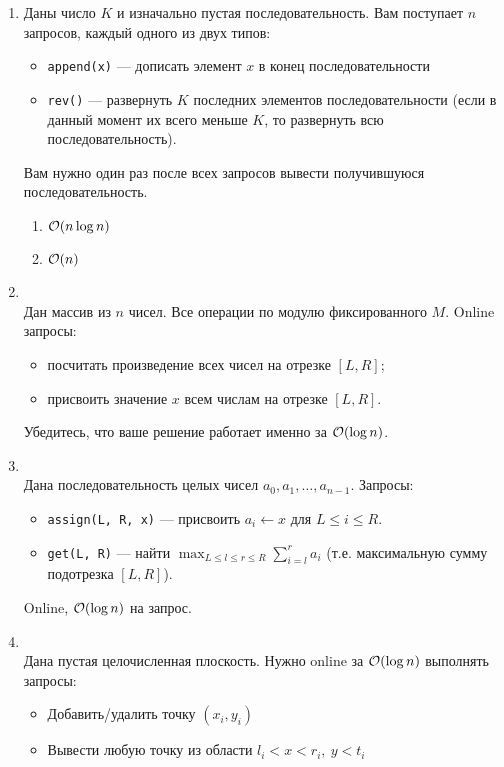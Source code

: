 \begin{enumerate}
  \item
    Даны число $K$ и изначально пустая последовательность. Вам поступает $n$ запросов, каждый одного из двух типов:
    \begin{itemize}
      \item \texttt{append(x)} --- дописать элемент $x$ в конец последовательности
      \item \texttt{rev()} ---
        развернуть $K$ последних элементов последовательности (если в данный момент их всего меньше $K$, то
        развернуть всю последовательность).
    \end{itemize}
    Вам нужно один раз после всех запросов вывести получившуюся последовательность.
    \begin{enumerate}
      \item $\mathcal{O}(n \log{n})$
      \item $\mathcal{O}(n)$
    \end{enumerate}

  \item {}\\
    Дан массив из $n$ чисел. Все операции по модулю фиксированного $M$. Online запросы:
	\begin{itemize}
		\item посчитать произведение всех чисел на отрезке $[L, R]$;
		\item присвоить значение $x$ всем числам на отрезке $[L, R]$.
	\end{itemize}
	Убедитесь, что ваше решение работает именно за $\mathcal{O}(\log n)$.

  \item {}\\
    Дана последовательность целых чисел $a_0, a_1, \dots, a_{n-1}$. Запросы:
    \begin{itemize}
      \item \texttt{assign(L, R, x)} --- присвоить $a_i \leftarrow x$ для $L \le i \le R$.
      \item
        \texttt{get(L, R)} --- найти $\max_{L \le l \le r \le R} \sum_{i=l}^r a_i$
        (т.е. максимальную сумму подотрезка $[L, R]$).
    \end{itemize}
    Online, $\mathcal{O}(\log{n})$ на запрос.

  \item {}\\
    Дана пустая целочисленная плоскость. Нужно online за $\mathcal{O}(\log n)$ выполнять запросы:
    \begin{itemize}
      \item Добавить/удалить точку $(x_i, y_i)$
      \item Вывести любую точку из области $l_i < x < r_i,~ y < t_i$
    \end{itemize}


\end{enumerate}
